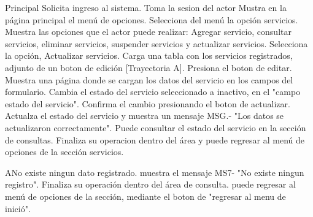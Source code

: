 	\begin{UCtrayectoria}{Principal}
		\UCpaso Solicita ingreso al sistema.
		\UCpaso Toma la sesion del actor
		\UCpaso Mustra en la página principal el menú de opciones. 
		\UCpaso[\UCactor] Selecciona del menú la opción servicios.
		\UCpaso Muestra las opciones que el actor puede realizar: Agregar servicio, consultar servicios, eliminar servicios, suspender servicios y actualizar servicios.
		\UCpaso[\UCactor] Selecciona la opción, Actualizar servicios.
		\UCpaso Carga una tabla con los servicios registrados, adjunto de un boton de edición [Trayectoria A].
		\UCpaso[\UCactor] Presiona el boton de editar.
		\UCpaso Muestra una página donde se cargan los datos del servicio en los campos del formulario.
		\UCpaso[\UCactor] Cambia el estado del servicio seleccionado a inactivo, en el "campo estado del servicio".
		\UCpaso[\UCactor] Confirma el cambio presionando el boton de actualizar.
		\UCpaso Actualza el estado del servicio y muestra un mensaje MSG.- "Los datos se actualizaron correctamente". 
		\UCpaso[\UCactor] Puede consultar el estado del servicio en la sección de consultas.
		\UCpaso[\UCactor] Finaliza su operacion dentro del área y puede regresar al menú de opciones de la sección servicios.
	\end{UCtrayectoria}

		\begin{UCtrayectoriaA}{A}{No existe ningun dato registrado.}
			\UCpaso muestra el mensaje MS7- "No existe ningun registro".
			\UCpaso[\UCactor] Finaliza su operación dentro del área de consulta.
			\UCpaso[\UCactor] puede regresar al menú de opciones de la sección, mediante el boton de "regresar al menu de inició".
		\end{UCtrayectoriaA}
	
